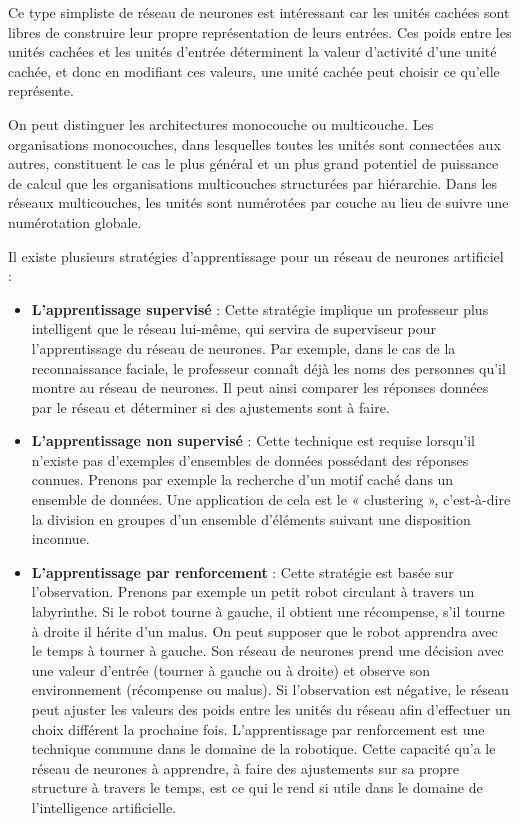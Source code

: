 \documentclass[a4paper, 12pt]{article} %
\begin{document}
Ce type simpliste de réseau de neurones est intéressant car les unités cachées sont libres de construire leur propre représentation de leurs entrées. Ces poids entre les unités cachées et les unités d’entrée déterminent la valeur d’activité d’une unité cachée, et donc en modifiant ces valeurs, une unité cachée peut choisir ce qu’elle représente.

On peut distinguer les architectures monocouche ou multicouche. Les organisations monocouches, dans lesquelles toutes les unités sont connectées aux autres, constituent le cas le plus général et un plus grand potentiel de puissance de calcul que les organisations multicouches structurées par hiérarchie. Dans les réseaux multicouches, les unités sont numérotées par couche au lieu de suivre une numérotation globale.

Il existe plusieurs stratégies d’apprentissage pour un réseau de neurones artificiel :
\begin{itemize}
	\item \textbf{L’apprentissage supervisé} : Cette stratégie implique un professeur plus intelligent que le réseau lui-même, qui servira de superviseur pour l’apprentissage du réseau de neurones. Par exemple, dans le cas de la reconnaissance faciale, le professeur connaît déjà les noms des personnes qu’il montre au réseau de neurones. Il peut ainsi comparer les réponses données par le réseau et déterminer si des ajustements sont à faire.
	
	\item \textbf{L’apprentissage non supervisé} : Cette technique est requise lorsqu’il n’existe pas d’exemples d’ensembles de données possédant des réponses connues. Prenons par exemple la recherche d’un motif caché dans un ensemble de données. Une application de cela est le « clustering », c’est-à-dire la division en groupes d’un ensemble d’éléments suivant une disposition inconnue.
		
	\item \textbf{L’apprentissage par renforcement} : Cette stratégie est basée sur l’observation. Prenons par exemple un petit robot circulant à travers un labyrinthe. Si le robot tourne à gauche, il obtient une récompense, s’il tourne à droite il hérite d’un malus. On peut supposer que le robot apprendra avec le temps à tourner à gauche. Son réseau de neurones prend une décision avec une valeur d’entrée (tourner à gauche ou à droite) et observe son environnement (récompense ou malus). Si l’observation est négative, le réseau peut ajuster les valeurs des poids entre les unités du réseau afin d’effectuer un choix différent la prochaine fois. L’apprentissage par renforcement est une technique commune dans le domaine de la robotique.
	Cette capacité qu’a le réseau de neurones à apprendre, à faire des ajustements sur sa propre structure à travers le temps, est ce qui le rend si utile dans le domaine de l’intelligence artificielle.
\end{itemize}
\end{document}
